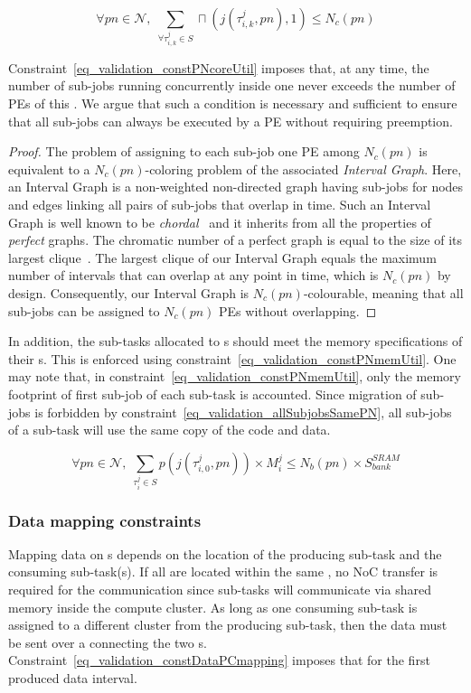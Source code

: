 \documentclass[main.tex]{subfiles}
\begin{document}
\begin{equation}
    \label{eq_validation_constPNcoreUtil}
    \forall pn \in \mathcal{N} , \;
    \underset{\forall \tau_{i,k}^j \in S}{\sum} \sqcap( j( \tau_{i,k}^j , pn ),1) \leq N_c(pn)
\end{equation}

Constraint~\ref{eq_validation_constPNcoreUtil} imposes that, at any time, the
number of sub-jobs running concurrently inside one \PN{} never exceeds the
number of PEs of this \PN{}. We argue that such a condition is necessary and
sufficient to ensure that all sub-jobs can always be executed by a PE without
requiring preemption. 

\begin{proof}
    The problem of assigning to each sub-job one PE among $N_c(pn)$ is
    equivalent to a $N_c(pn)$-coloring problem of the associated \emph{Interval
    Graph}. Here, an Interval Graph is a non-weighted non-directed graph having
    sub-jobs for nodes and edges linking all pairs of sub-jobs that overlap in
    time. Such an Interval Graph is well known to be
    \emph{chordal}~\cite{Lekkeikerker1962} and it inherits from all the
    properties of \emph{perfect} graphs. The chromatic number of a perfect
    graph is equal to the size of its largest clique~\cite{Fanica1972}. The
    largest clique of our Interval Graph equals the maximum number of intervals
    that can overlap at any point in time, which is $N_c(pn)$ by design.
    Consequently, our Interval Graph is $N_c(pn)$-colourable, meaning that all
    sub-jobs can be assigned to $N_c(pn)$ PEs without overlapping.
\end{proof}

In addition, the sub-tasks allocated to \PN{}s should meet the memory
specifications of their \PN{}s. This is enforced using
constraint~\ref{eq_validation_constPNmemUtil}. One may note that, in
constraint~\ref{eq_validation_constPNmemUtil}, only the memory footprint of
first sub-job of each sub-task is accounted. Since migration of sub-jobs is
forbidden by constraint~\ref{eq_validation_allSubjobsSamePN}, all sub-jobs of a
sub-task will use the same copy of the code and data.

\begin{equation}
    \label{eq_validation_constPNmemUtil}
    \forall pn \in \mathcal{N} , \;
    \underset{ \tau_i^j \in S }{\sum} p( j( \tau_{i,0}^j , pn ) ) \times M_i^j \leq N_b(pn) \times S_{bank}^{SRAM}
\end{equation}

\subsubsection{Data mapping constraints}
Mapping data on \PC{}s depends on the location of the producing sub-task and
the consuming sub-task(s). If all are located within the same \PN{}, no NoC
transfer is required for the communication since sub-tasks will communicate via
shared memory inside the compute cluster. As long as one consuming sub-task is
assigned to a different cluster from the producing sub-task, then the data must
be sent over a \PC{} connecting the two \PN{}s.
Constraint~\ref{eq_validation_constDataPCmapping} imposes that for the first
produced data interval.
\end{document}
